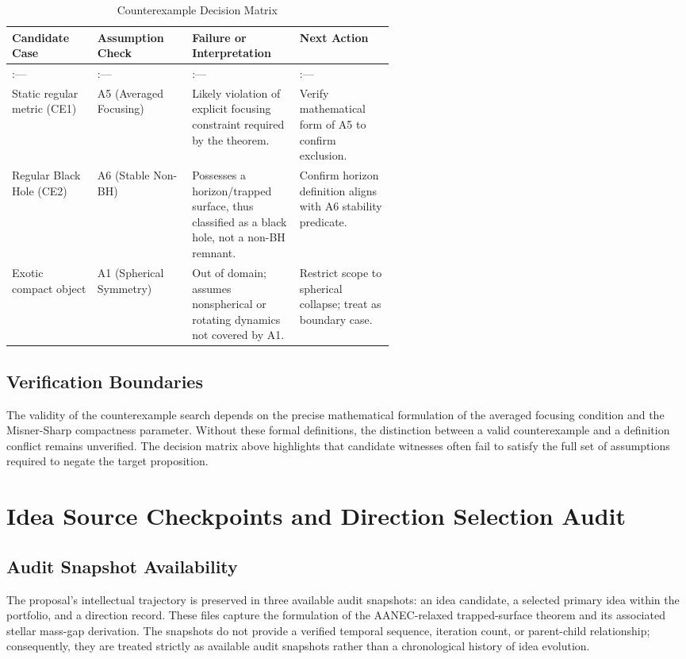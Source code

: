 \documentclass[conference]{IEEEtran}
\begin{document}
\begin{table}[htbp]
\centering
\small
\caption{Counterexample Decision Matrix}
\label{tab:forward-derivation-and-counterexamples-table1}
\begin{tabular}{|p{0.14\linewidth}|p{0.14\linewidth}|p{0.14\linewidth}|p{0.14\linewidth}|}
\hline
Candidate Case & Assumption Check & Failure or Interpretation & Next Action \\\hline
:--- & :--- & :--- & :--- \\\hline
Static regular metric (CE1) & A5 (Averaged Focusing) & Likely violation of explicit focusing constraint required by the theorem. & Verify mathematical form of A5 to confirm exclusion. \\\hline
Regular Black Hole (CE2) & A6 (Stable Non-BH) & Possesses a horizon/trapped surface, thus classified as a black hole, not a non-BH remnant. & Confirm horizon definition aligns with A6 stability predicate. \\\hline
Exotic compact object & A1 (Spherical Symmetry) & Out of domain; assumes nonspherical or rotating dynamics not covered by A1. & Restrict scope to spherical collapse; treat as boundary case. \\\hline
\end{tabular}
\end{table}

\subsection{Verification Boundaries}
The validity of the counterexample search depends on the precise mathematical formulation of the averaged focusing condition and the Misner-Sharp compactness parameter. Without these formal definitions, the distinction between a valid counterexample and a definition conflict remains unverified. The decision matrix above highlights that candidate witnesses often fail to satisfy the full set of assumptions required to negate the target proposition.

\appendices
\section{Idea Source Checkpoints and Direction Selection Audit}
\subsection{Audit Snapshot Availability}
The proposal's intellectual trajectory is preserved in three available audit snapshots: an idea candidate, a selected primary idea within the portfolio, and a direction record. These files capture the formulation of the AANEC-relaxed trapped-surface theorem and its associated stellar mass-gap derivation. The snapshots do not provide a verified temporal sequence, iteration count, or parent-child relationship; consequently, they are treated strictly as available audit snapshots rather than a chronological history of idea evolution.
\end{document}
